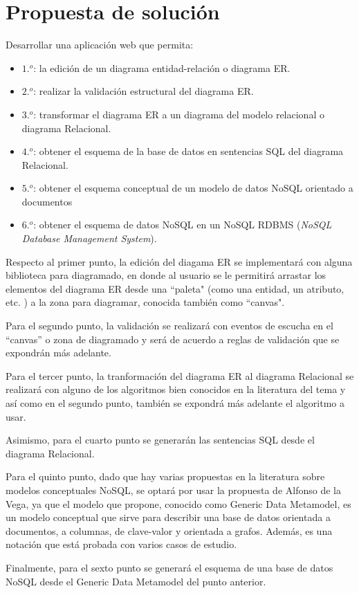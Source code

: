 \section{Propuesta de solución}

Desarrollar una aplicación web que permita:

\begin{itemize}
    \item $1.^{o}$: la edición de un diagrama entidad-relación o diagrama ER.
    \item $2.^{o}$: realizar la validación estructural del diagrama ER.
    \item $3.^{o}$: transformar el diagrama ER a un diagrama del modelo relacional o diagrama Relacional.
    \item $4.^{o}$: obtener el esquema de la base de datos en sentencias SQL del diagrama Relacional.
    \item $5.^{o}$: obtener el esquema conceptual de un modelo de datos NoSQL orientado a documentos
    \item $6.^{o}$: obtener el esquema de datos NoSQL en un NoSQL RDBMS (\textit{NoSQL Database Management System}).
\end{itemize}

Respecto al primer punto, la edición del diagama ER se implementará con alguna biblioteca para diagramado, en donde al usuario se le permitirá arrastar los elementos del diagrama ER desde una ``paleta" (como una entidad, un atributo, etc. ) a la zona para diagramar, conocida también como ``canvas".


Para el segundo punto, la validación se realizará con eventos de escucha en el ``canvas'' o zona de diagramado y será de acuerdo a reglas de validación que se expondrán más adelante.


Para el tercer punto, la tranformación del diagrama ER al diagrama Relacional se realizará con alguno de los algoritmos bien conocidos en la literatura del tema y así como en el segundo punto, también se expondrá más adelante el algoritmo a usar.


Asimismo, para el cuarto punto se generarán las sentencias SQL desde el diagrama Relacional.


Para el quinto punto, dado que hay varias propuestas en la literatura sobre modelos conceptuales NoSQL, se optará por usar la propuesta de Alfonso de la Vega\cite{de_la_vega_mortadelo_2020}, ya que el modelo que propone, conocido como Generic Data Metamodel, es un modelo conceptual que sirve para describir una base de datos orientada a documentos, a columnas, de clave-valor y orientada a grafos. Además, es una notación que está probada con varios casos de estudio.


Finalmente, para el sexto punto se generará el esquema de una base de datos NoSQL desde el Generic Data Metamodel del punto anterior.